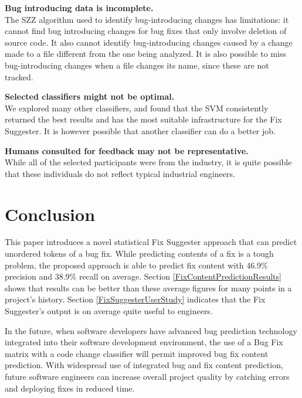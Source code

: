 \documentclass[conference]{IEEEtran}
\begin{document}
\par \textbf{Bug introducing data is incomplete.} \\ The SZZ algorithm used to identify bug-introducing
changes has limitations: it cannot find bug introducing changes for bug fixes that only involve deletion of source code.
It also cannot identify bug-introducing changes caused by a change made to a file different from the one being analyzed. It is also possible to miss bug-introducing changes when a file changes its name, since these are not tracked.

\par \textbf{Selected classifiers might not be optimal.} \\ We explored many
other classifiers, and found that the SVM consistently returned the
best results and has the most suitable infrastructure for the Fix Suggester. It is however possible that another classifier can do a better job.

\par \textbf{Humans consulted for feedback may not be representative.} \\ While all of the selected participants were from the industry, it is quite possible that these individuals do not reflect typical industrial engineers.

\section{Conclusion}
\par This paper introduces a novel statistical Fix Suggester approach that can predict unordered tokens of a bug fix. While predicting contents of a fix is a tough problem, the proposed approach is able to predict fix content with 46.9\% precision and 38.9\% recall on average. Section \ref{FixContentPredictionResults} shows that results can be better than these average figures for many points in a project's history. Section \ref{FixSuggesterUserStudy} indicates that the Fix Suggester's output is on average quite useful to engineers.

\par In the future, when software developers have advanced bug prediction technology
integrated into their software development environment, the use of a Bug Fix matrix with a code change classifier will permit improved bug fix content prediction. With
widespread use of integrated bug and fix content prediction, future software engineers can
increase overall project quality by catching errors and deploying fixes in reduced time.





 
\end{document}
